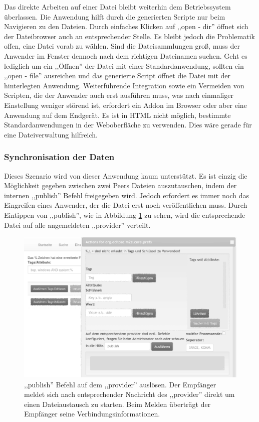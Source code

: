 \documentclass[oneside, ngerman, toc=bibliography,bibliography=totoc,listof=entryprefix, open=right,numbers=noenddot,fontsize=12pt]{scrbook}
\begin{document}
Das direkte Arbeiten auf einer Datei bleibt weiterhin dem Betriebssystem überlassen. Die Anwendung hilft durch die generierten Scripte nur beim Navigieren zu den Dateien. Durch einfaches Klicken auf ,,open - dir'' öffnet sich der Dateibrowser auch an entsprechender Stelle. Es bleibt jedoch die Problematik offen, eine Datei vorab zu wählen. Sind die Dateisammlungen groß, muss der Anwender im Fenster dennoch nach dem richtigen Dateinamen suchen. Geht es lediglich um ein ,,Öffnen'' der Datei mit einer Standardanwendung, sollten ein ,,open - file'' ausreichen und das generierte Script öffnet die Datei mit der hinterlegten Anwendung.
Weiterführende Integration sowie ein Vermeiden von Scripten, die der Anwender auch erst ausführen muss, was nach einmaliger Einstellung weniger störend ist, erfordert ein Addon im Browser oder aber eine Anwendung auf dem Endgerät. Es ist in HTML nicht möglich, bestimmte Standardanwendungen in der Weboberfläche zu verwenden. Dies wäre gerade für eine Dateiverwaltung hilfreich.

 
\subsubsection{Synchronisation der Daten}
Dieses Szenario wird von dieser Anwendung kaum unterstützt. Es ist einzig die Möglichkeit gegeben zwischen zwei Peers Dateien auszutauschen, indem der internen ,,publish'' Befehl freigegeben wird. Jedoch erfordert es immer noch das Eingreifen eines Anwender, der die Datei erst noch veröffentlichen muss. Durch Eintippen von ,,publish'', wie in Abbildung \ref{fig:www-cmd-pub} zu sehen, wird die entsprechende Datei auf alle angemeldeten ,,provider'' verteilt.

\begin{figure}[htbp] 
    \centering
    \includegraphics[width=\textwidth]{Masterarbeit_Bilder/www_cmd_publish.png}
    \caption{ ,,publish'' Befehl auf dem ,,provider'' auslösen. Der Empfänger meldet sich nach entsprechender Nachricht des  ,,provider'' direkt um einen Dateiaustausch zu starten. Beim Melden überträgt der Empfänger seine Verbindungsinformationen.}
    \label{fig:www-cmd-pub}
\end{figure}  
\end{document}
